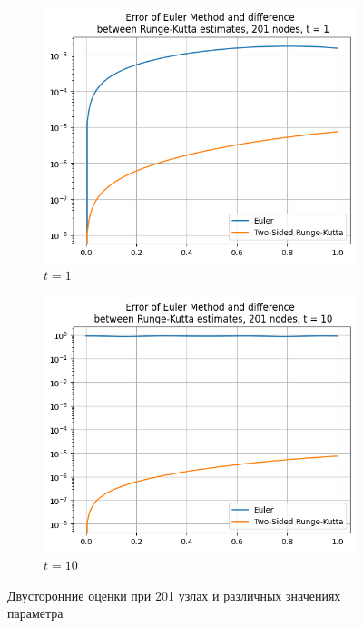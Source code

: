 \begin{figure}[H]
	\centering
	\begin{subfigure}{0.45\textwidth}
		\centering
		\includegraphics[width=\linewidth]{img/errorEulerAndDifferenceBtwEstimates/ErrEuDifRK21}
		\caption{$t = 1$}
	\end{subfigure}
	\hfill
	\begin{subfigure}{0.45\textwidth}
		\centering
		\includegraphics[width=\linewidth]{img/errorEulerAndDifferenceBtwEstimates/ErrEuDifRK22}
		\caption{$t = 10$}
	\end{subfigure}
	\caption{Двусторонние оценки при 201 узлах и различных значениях параметра}
	\label{fig:two_graphs}
\end{figure}

